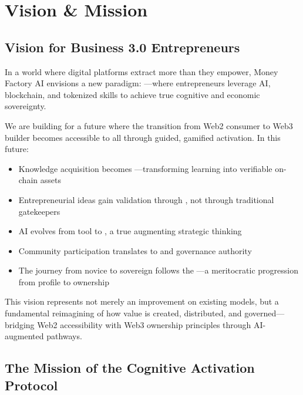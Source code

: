 \section{Vision \& Mission}


\subsection*{Vision for Business 3.0 Entrepreneurs}

In a world where digital platforms extract more than they empower, Money Factory AI envisions a new paradigm: —where entrepreneurs leverage AI, blockchain, and tokenized skills to achieve true cognitive and economic sovereignty.

We are building for a future where the transition from Web2 consumer to Web3 builder becomes accessible to all through guided, gamified activation. In this future:

\begin{itemize}
    \item Knowledge acquisition becomes —transforming learning into verifiable on-chain assets
    \item Entrepreneurial ideas gain validation through , not through traditional gatekeepers
    \item AI evolves from tool to , a true  augmenting strategic thinking
    \item Community participation translates to  and governance authority
    \item The journey from novice to sovereign follows the —a meritocratic progression from profile to ownership
\end{itemize}

This vision represents not merely an improvement on existing models, but a fundamental reimagining of how value is created, distributed, and governed—bridging Web2 accessibility with Web3 ownership principles through AI-augmented pathways.

\subsection{The Mission of the Cognitive Activation Protocol}

